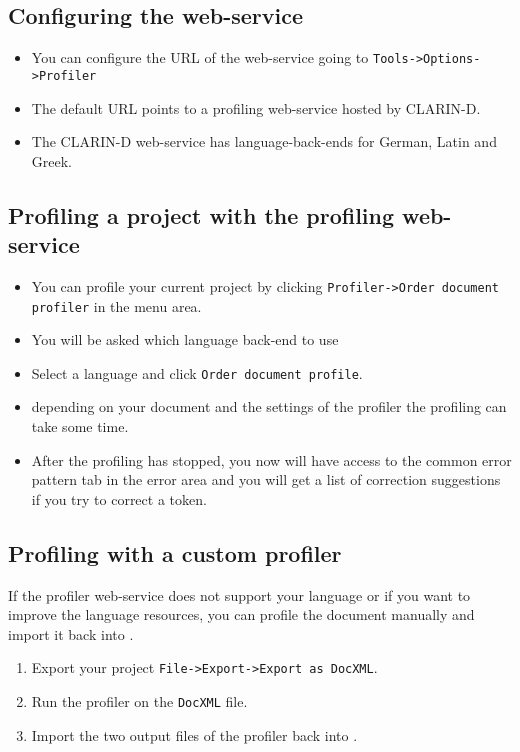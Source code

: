 \subsection{Configuring the web-service}
\begin{frame}
	\begin{itemize}
		\item You can configure the URL of the web-service going to
			\texttt{Tools->Options->Profiler}
		\item The default URL points to a profiling web-service hosted by CLARIN-D.
		\item The CLARIN-D web-service has language-back-ends for German, Latin and
			Greek.
	\end{itemize}
\end{frame}

\subsection{Profiling a project with the profiling web-service}
\begin{frame}
	\begin{itemize}
		\item You can profile your current project by clicking
			\texttt{Profiler->Order document profiler} in the menu area.
		\item You will be asked which language back-end to use
		\item Select a language and click \texttt{Order document profile}.
		\item depending on your document and the settings of the profiler the
			profiling can take some time.
		\item After the profiling has stopped, you now will have access to the
			common error pattern tab in the error area and you will get a list of
			correction suggestions if you try to correct a token.
	\end{itemize}
\end{frame}

\subsection{Profiling with a custom profiler}
\begin{frame}
		If the profiler web-service does not support your language or if you want to
		improve the language resources, you can profile the document manually and
		import it back into \pocoto{}.
	\begin{enumerate}
		\item Export your project \texttt{File->Export->Export as DocXML}.
		\item Run the profiler on the \texttt{DocXML} file.
		\item Import the two output files of the profiler back into \pocoto{}.
	\end{enumerate}
\end{frame}

\section{}
\subsection{}
\begin{frame}
\end{frame}



